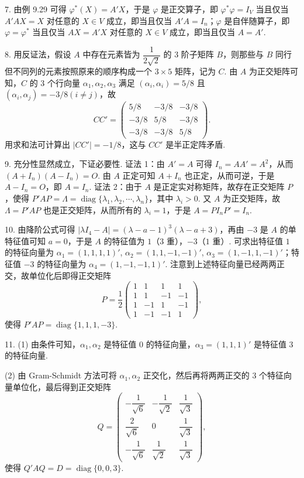 \documentclass[UTF8, 12pt, fontset=fandol, oneside]{ctexart}
\begin{document}
7. 由例 9.29 可得 $\varphi^*(X)=A'X$，于是 $\varphi$ 是正交算子，即 $\varphi^*\varphi=I_V$ 当且仅当 $A'AX=X$ 对任意的 $X\in V$ 成立，即当且仅当 $A'A=I_n$；$\varphi$ 是自伴随算子，即 $\varphi=\varphi^*$ 当且仅当 $AX=A'X$ 对任意的 $X\in V$ 成立，即当且仅当 $A=A'$.

8. 用反证法，假设 $A$ 中存在元素皆为 $\dfrac{1}{2\sqrt{2}}$ 的 $3$ 阶子矩阵 $B$，则那些与 $B$ 同行但不同列的元素按照原来的顺序构成一个 $3\times5$ 矩阵，记为 $C$. 由 $A$ 为正交矩阵可知，$C$ 的 $3$ 个行向量 $\alpha_1,\alpha_2,\alpha_3$ 满足 $(\alpha_i,\alpha_i)=5/8$ 且 $(\alpha_i,\alpha_j)=-3/8(i\ne j)$，故
\[
CC'=\begin{pmatrix}
5/8&-3/8&-3/8\\
-3/8&5/8&-3/8\\
-3/8&-3/8&5/8
\end{pmatrix}.
\]
用求和法可计算出 $|CC'|=-1/8$，这与 $CC'$ 是半正定阵矛盾.

9. 充分性显然成立，下证必要性. 证法 1：由 $A'=A$ 可得 $I_n=AA'=A^2$，从而 $(A+I_n)(A-I_n)=O$. 由 $A$ 正定可知 $A+I_n$ 也正定，从而可逆，于是 $A-I_n=O$，即 $A=I_n$. 证法 2：由于 $A$ 是正定实对称矩阵，故存在正交矩阵 $P$，使得 $P'AP=\Lambda=\operatorname{diag}\{\lambda_1,\lambda_2,\cdots,\lambda_n\}$，其中 $\lambda_i>0$. 又 $A$ 为正交矩阵，故 $\Lambda=P'AP$ 也是正交矩阵，从而所有的 $\lambda_i=1$，于是 $A=PI_nP'=I_n$.

10. 由降阶公式可得 $|\lambda I_4-A|=(\lambda-a-1)^3(\lambda-a+3)$，再由 $-3$ 是 $A$ 的单特征值可知 $a=0$，于是 $A$ 的特征值为 $1$（$3$ 重），$-3$（$1$ 重）. 可求出特征值 $1$ 的特征向量为 $\alpha_1=(1,1,1,1)'$, $\alpha_2=(1,1,-1,-1)'$, $\alpha_3=(1,-1,1,-1)'$；特征值 $-3$ 的特征向量为 $\alpha_4=(1,-1,-1,1)'$. 注意到上述特征向量已经两两正交，故单位化后即得正交矩阵
\[
P=\frac{1}{2}\begin{pmatrix}
1&1&1&1\\
1&1&-1&-1\\
1&-1&1&-1\\
1&-1&-1&1
\end{pmatrix},
\]
使得 $P'AP=\operatorname{diag}\{1,1,1,-3\}$.

11. (1) 由条件可知，$\alpha_1,\alpha_2$ 是特征值 $0$ 的特征向量，$\alpha_3=(1,1,1)'$ 是特征值 $3$ 的特征向量.

(2) 由 Gram-Schmidt 方法可将 $\alpha_1,\alpha_2$ 正交化，然后再将两两正交的 $3$ 个特征向量单位化，最后得到正交矩阵
\[
Q=\begin{pmatrix}
-\dfrac{1}{\sqrt{6}}&-\dfrac{1}{\sqrt{2}}&\dfrac{1}{\sqrt{3}}\\
\dfrac{2}{\sqrt{6}}&0&\dfrac{1}{\sqrt{3}}\\
-\dfrac{1}{\sqrt{6}}&\dfrac{1}{\sqrt{2}}&\dfrac{1}{\sqrt{3}}
\end{pmatrix},
\]
使得 $Q'AQ=D=\operatorname{diag}\{0,0,3\}$.
\end{document}
